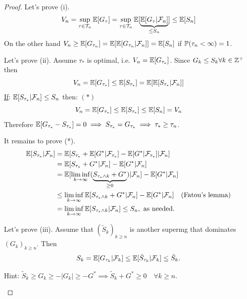 \begin{proof}
    Let's prove (i).
    $$V_n = \sup_{\tau \in \mathcal{T}_n} \mathbb E[G_\tau] = \sup_{\tau \in \mathcal{T}_n} \mathbb E[\underbrace{\mathbb E[G_\tau | \mathcal{F}_n]}_{\le S_n}] \le \mathbb E[S_n]$$
    On the other hand $V_n \ge \mathbb E[G_{\tau_n}] = \mathbb E[\mathbb E[G_{\tau_n} | \mathcal{F}_n]] = \mathbb E[S_n]$ if $\mathbb P(\tau_n < \infty) = 1$.

    Let's prove (ii). Assume $\tau_*$ is optimal, i.e.
    $V_n = \mathbb E[G_{\tau_*}]$. Since $G_k \le S_k \forall k \in \mathbb Z^+$ then
    $$V_n = \mathbb E[G_{\tau_*}] \le \mathbb E[S_{\tau_*}] = \mathbb E[\mathbb E[S_{\tau_*} | \mathcal{F}_n]]$$
    \underline{If}: $\mathbb E[S_{\tau_*} | \mathcal{F}_n] \le S_n$ then: \hfill $(*)$
    $$V_n = \mathbb E[G_{\tau_*}] \le \mathbb E[S_{\tau_*}] \le \mathbb E[S_n] = V_n$$
    Therefore $\mathbb E[G_{\tau_*} - S_{\tau_*}] = 0 \implies S_{\tau_*} = G_{\tau_*} \implies \tau_* \ge \tau_n$.

    It remains to prove (*).
    \begin{align*}
        \mathbb E[S_{\tau_*} | \mathcal{F}_n] &= \mathbb E[S_{\tau_*} + \mathbb E[G^* | \mathcal{F}_{\tau_*}] - \mathbb E[G^* | \mathcal{F}_{\tau_*}] | \mathcal{F}_n] \\
        &= \mathbb E[S_{\tau_*} + G^* | \mathcal{F}_n] - \mathbb E[G^* | \mathcal{F}_n] \\
        &= \mathbb E[\liminf_{k \to \infty} (\underbrace{S_{\tau_* \wedge k} + G^*}_{\ge 0}) | \mathcal{F}_n] - \mathbb E[G^* | \mathcal{F}_n] \\
        &\le \liminf_{k \to \infty} \mathbb E[S_{\tau_* \wedge k} + G^* | \mathcal{F}_n] - \mathbb E[G^* | \mathcal{F}_n] \quad (\text{Fatou's lemma}) \\
        &= \liminf_{k \to \infty} \mathbb E[S_{\tau_* \wedge k} | \mathcal{F}_n] \le S_n, \text{ as needed.}
    \end{align*}

    Let's prove (iii). Assume that $(\tilde{S}_k)_{k \ge n}$ is another supermg that dominates $(G_k)_{k \ge n}$. Then
    $$S_k = \mathbb E[G_{\tau_k} | \mathcal{F}_k] \le \mathbb E[\tilde{S}_{\tau_k} | \mathcal{F}_k] \le \tilde{S}_k.$$
    \begin{homework}
        Hint: $\tilde{S}_k \ge G_k \ge -|G_k| \ge -G^* \implies \tilde{S}_k + G^* \ge 0 \quad \forall k \ge n$.
    \end{homework}
\end{proof}

